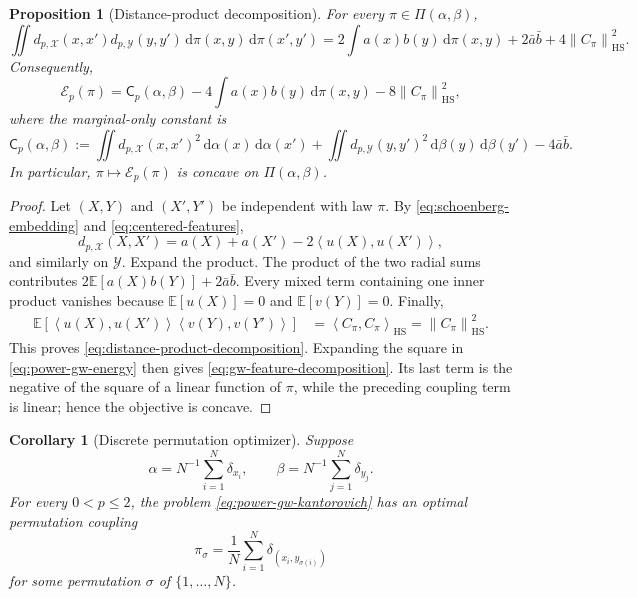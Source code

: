 \documentclass[11pt,a4paper]{article}
\newtheorem{proposition}[theorem]{Proposition}
\newtheorem{corollary}[theorem]{Corollary}
\theoremstyle{definition}
\theoremstyle{remark}
\newcommand{\Ecal}{\mathcal E}
\newcommand{\Piopt}{\Pi}
\newcommand{\HS}{\operatorname{HS}}
\newcommand{\dd}{\,\mathrm d}
\newcommand{\norm}[1]{\left\lVert #1\right\rVert}
\newcommand{\ip}[2]{\left\langle #1,#2\right\rangle}
\begin{document}
\begin{proposition}[Distance-product decomposition]
\label{prop:distance-product-decomposition}
For every \(\pi\in\Piopt(\alpha,\beta)\),
\begin{equation}
  \iint d_{p,\mathcal X}(x,x')d_{p,\mathcal Y}(y,y')
  \dd\pi(x,y)\dd\pi(x',y')
  =2\int a(x)b(y)\dd\pi(x,y)
   +2\bar a\bar b+4\norm{C_\pi}_{\HS}^2.
  \label{eq:distance-product-decomposition}
\end{equation}
Consequently,
\begin{equation}
  \Ecal_p(\pi)
  =\mathsf C_p(\alpha,\beta)
   -4\int a(x)b(y)\dd\pi(x,y)
   -8\norm{C_\pi}_{\HS}^2,
  \label{eq:gw-feature-decomposition}
\end{equation}
where the marginal-only constant is
\begin{equation}
  \mathsf C_p(\alpha,\beta)
  :=\iint d_{p,\mathcal X}(x,x')^2\dd\alpha(x)\dd\alpha(x')
    +\iint d_{p,\mathcal Y}(y,y')^2\dd\beta(y)\dd\beta(y')
    -4\bar a\bar b.
  \label{eq:gw-marginal-constant}
\end{equation}
In particular, \(\pi\mapsto\Ecal_p(\pi)\) is concave on
\(\Piopt(\alpha,\beta)\).
\end{proposition}

\begin{proof}
Let \((X,Y)\) and \((X',Y')\) be independent with law \(\pi\).  By
\eqref{eq:schoenberg-embedding} and \eqref{eq:centered-features},
\[
  d_{p,\mathcal X}(X,X')
  =a(X)+a(X')-2\ip{u(X)}{u(X')},
\]
and similarly on \(\mathcal Y\).  Expand the product.  The product of the
two radial sums contributes
\(2\mathbb E[a(X)b(Y)]+2\bar a\bar b\).  Every mixed term containing one
inner product vanishes because \(\mathbb E[u(X)]=0\) and
\(\mathbb E[v(Y)]=0\).  Finally,
\begin{align*}
  \mathbb E\!\left[
    \ip{u(X)}{u(X')}\ip{v(Y)}{v(Y')}
  \right]
  &=\ip{C_\pi}{C_\pi}_{\HS}
   =\norm{C_\pi}_{\HS}^2.
\end{align*}
This proves \eqref{eq:distance-product-decomposition}.  Expanding the square
in \eqref{eq:power-gw-energy} then gives
\eqref{eq:gw-feature-decomposition}.  Its last term is the negative of the
square of a linear function of \(\pi\), while the preceding coupling term is
linear; hence the objective is concave.
\end{proof}

\begin{corollary}[Discrete permutation optimizer]
\label{cor:finite-permutation-optimizer}
Suppose
\[
 \alpha=N^{-1}\sum_{i=1}^N\delta_{x_i},
 \qquad
 \beta=N^{-1}\sum_{j=1}^N\delta_{y_j}.
\]
For every \(0<p\leq2\), the problem \eqref{eq:power-gw-kantorovich} has an
optimal permutation coupling
\begin{equation}
  \pi_\sigma=\frac1N\sum_{i=1}^N\delta_{(x_i,y_{\sigma(i)})}
  \label{eq:finite-permutation-coupling}
\end{equation}
for some permutation \(\sigma\) of \(\{1,\ldots,N\}\).
\end{corollary}
\end{document}
